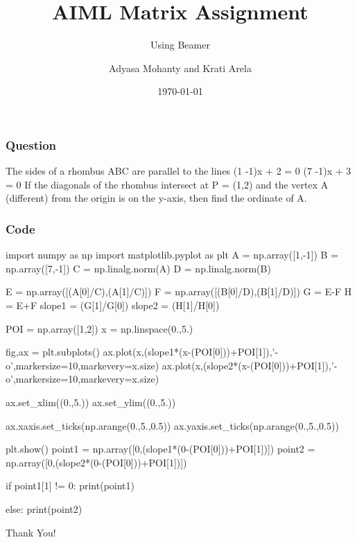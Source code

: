 \documentclass{beamer}
\title{AIML Matrix Assignment}
\subtitle{Using Beamer}
\author{Adyasa Mohanty and Krati Arela}
\institute{IIT Hyderabad}
\date{\today}
\begin{document}
\begin{frame}
\titlepage
\end{frame}

\begin{frame}
\frametitle{Question}
The sides of a rhombus ABC are parallel to the lines 
(1 -1)x + 2 = 0
(7 -1)x + 3 = 0
If the diagonals of the rhombus intersect at P = (1,2) and the vertex A (different) from the origin is on the y-axis, then find the ordinate of A. 
\end{frame}

\begin{frame}[fragile]
\frametitle{Code}
\begin{semiverbatim}
import numpy as np
import matplotlib.pyplot as plt
A = np.array([1,-1])
B = np.array([7,-1])
C = np.linalg.norm(A)
D = np.linalg.norm(B)

E = np.array([(A[0]/C),(A[1]/C)])
F = np.array([(B[0]/D),(B[1]/D)])
G = E-F
H = E+F
slope1 = (G[1]/G[0])
slope2 = (H[1]/H[0])

POI = np.array([1,2])
x = np.linspace(0.,5.)
\end{semiverbatim}
\end{frame}

\begin{frame}[fragile]
\begin{semiverbatim}
fig,ax = plt.subplots()
ax.plot(x,(slope1*(x-(POI[0]))+POI[1]),'-o',markersize=10,markevery=x.size)
ax.plot(x,(slope2*(x-(POI[0]))+POI[1]),'-o',markersize=10,markevery=x.size)

ax.set_xlim((0.,5.))
ax.set_ylim((0.,5.))

ax.xaxis.set_ticks(np.arange(0.,5.,0.5))
ax.yaxis.set_ticks(np.arange(0.,5.,0.5))

plt.show()
point1 = np.array([0,(slope1*(0-(POI[0]))+POI[1])])
point2 = np.array([0,(slope2*(0-(POI[0]))+POI[1])])

if point1[1] != 0:
	print(point1)

\end{semiverbatim}
\end{frame}

\begin{frame}[fragile]
\begin{semiverbatim}

else:
	print(point2)
	

\end{semiverbatim}
\end{frame}

\begin{frame}
Thank You!
\end{frame}
\end{document}
